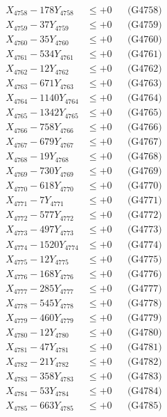 \documentclass[a4paper,10pt]{article}
\begin{document}
{\begin{align}
X_{4758} - 178Y_{4758} &\leq +0 && \text{(G4758)} \\
X_{4759} - 37Y_{4759} &\leq +0 && \text{(G4759)} \\
X_{4760} - 35Y_{4760} &\leq +0 && \text{(G4760)} \\
\allowbreak
X_{4761} - 534Y_{4761} &\leq +0 && \text{(G4761)} \\
X_{4762} - 12Y_{4762} &\leq +0 && \text{(G4762)} \\
X_{4763} - 671Y_{4763} &\leq +0 && \text{(G4763)} \\
X_{4764} - 1140Y_{4764} &\leq +0 && \text{(G4764)} \\
X_{4765} - 1342Y_{4765} &\leq +0 && \text{(G4765)} \\
X_{4766} - 758Y_{4766} &\leq +0 && \text{(G4766)} \\
X_{4767} - 679Y_{4767} &\leq +0 && \text{(G4767)} \\
X_{4768} - 19Y_{4768} &\leq +0 && \text{(G4768)} \\
X_{4769} - 730Y_{4769} &\leq +0 && \text{(G4769)} \\
X_{4770} - 618Y_{4770} &\leq +0 && \text{(G4770)} \\
\allowbreak
X_{4771} - 7Y_{4771} &\leq +0 && \text{(G4771)} \\
X_{4772} - 577Y_{4772} &\leq +0 && \text{(G4772)} \\
X_{4773} - 497Y_{4773} &\leq +0 && \text{(G4773)} \\
X_{4774} - 1520Y_{4774} &\leq +0 && \text{(G4774)} \\
X_{4775} - 12Y_{4775} &\leq +0 && \text{(G4775)} \\
X_{4776} - 168Y_{4776} &\leq +0 && \text{(G4776)} \\
X_{4777} - 285Y_{4777} &\leq +0 && \text{(G4777)} \\
X_{4778} - 545Y_{4778} &\leq +0 && \text{(G4778)} \\
X_{4779} - 460Y_{4779} &\leq +0 && \text{(G4779)} \\
X_{4780} - 12Y_{4780} &\leq +0 && \text{(G4780)} \\
\allowbreak
X_{4781} - 47Y_{4781} &\leq +0 && \text{(G4781)} \\
X_{4782} - 21Y_{4782} &\leq +0 && \text{(G4782)} \\
X_{4783} - 358Y_{4783} &\leq +0 && \text{(G4783)} \\
X_{4784} - 53Y_{4784} &\leq +0 && \text{(G4784)} \\
X_{4785} - 663Y_{4785} &\leq +0 && \text{(G4785)} \\

\end{align}}
\end{document}
